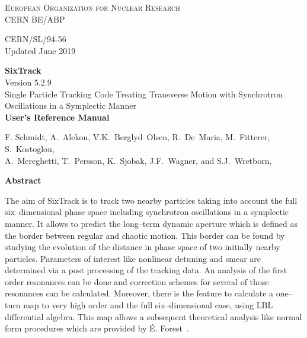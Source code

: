 \begin{titlepage}
\begin{center}\normalsize\scshape
    European Organization for Nuclear Research \\
    CERN BE/ABP
\end{center}
\vspace*{2mm}
\begin{flushright}
    CERN/SL/94-56 \\
    Updated June 2019
\end{flushright}
\begin{center}\Huge
    \textbf{SixTrack} \\
    \LARGE Version 5.2.9 \\
    \vspace*{8mm}Single Particle Tracking Code Treating Transverse Motion with Synchrotron Oscillations in a Symplectic Manner \\
    \vspace*{8mm}\textbf{User's Reference Manual}
\end{center}
\begin{center}
    F. Schmidt,
    A.~Alekou,
    V.K.~Berglyd~Olsen,
    R.~De~Maria,
    M.~Fitterer,
    S.~Kostoglou,\\
    A.~Mereghetti,
    T.~Persson,
    K.~Sjobak,
    J.F.~Wagner,
    and
    S.J.~Wretborn,
\end{center}
\begin{center}\large
    \vspace*{10mm}\textbf{Abstract} \\
\end{center}
The aim of SixTrack is to track two nearby particles taking into account the full six--dimensional phase space including synchrotron oscillations in a symplectic manner.
It allows to predict the long--term dynamic aperture which is defined as the border between regular and chaotic motion.
This border can be found by studying the evolution of the distance in phase space of two initially nearby particles.
Parameters of interest like nonlinear detuning and smear are determined via a post processing of the tracking data.
An analysis of the first order resonances can be done and correction schemes for several of those resonances can be calculated.
Moreover, there is the feature to calculate a one--turn map to very high order and the full six--dimensional case, using LBL differential algebra.
This map allows a subsequent theoretical analysis like normal form procedures which are provided by \'{E}. Forest~\cite{DALIE}.


\end{titlepage}
